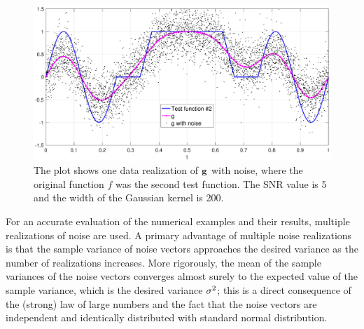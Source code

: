 \begin{figure}
	\centerline{\includegraphics[scale = 0.45]{Figures/NoisePlot1D_F2_S05_W200.eps}}
\caption{The plot shows one data realization of $\mathbf{g}$ with noise, where the original function $f$ was the second test function. The SNR value is 5 and the width of the Gaussian kernel is 200.}
\label{NoisePlot1D_F2_S05_W200}
\end{figure}

For an accurate evaluation of the numerical examples and their results, multiple realizations of noise are used. A primary advantage of multiple noise realizations is that the sample variance of noise vectors approaches the desired variance as the number of realizations increases. More rigorously, the mean of the sample variances of the noise vectors converges almost surely to the expected value of the sample variance, which is the desired variance $\sigma^2$; this is a direct consequence of the (strong) law of large numbers and the fact that the noise vectors are independent and identically distributed with standard normal distribution.

